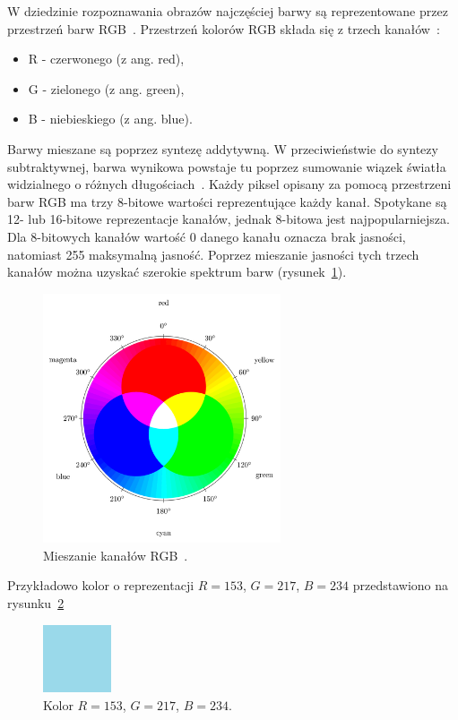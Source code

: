 \documentclass[a4paper,twoside,12pt]{book}
\begin{document}
    W dziedzinie rozpoznawania obrazów najczęściej barwy są reprezentowane przez przestrzeń barw
    RGB~\cite{przestrzenieKolorow}.
    Przestrzeń kolorów RGB składa się z trzech kanałów~\cite{kolory}:
    \begin{itemize}
        \item R - czerwonego (z ang. red),
        \item G - zielonego (z ang. green),
        \item B - niebieskiego (z ang. blue).
    \end{itemize}
    Barwy mieszane są poprzez syntezę addytywną.
    W przeciwieństwie do syntezy subtraktywnej, barwa wynikowa powstaje tu poprzez sumowanie wiązek światła widzialnego o
    różnych długościach~\cite{przestrzenieKolorow}.
    Każdy piksel opisany za pomocą przestrzeni barw RGB ma trzy 8-bitowe wartości reprezentujące każdy kanał.
    Spotykane
    są 12- lub 16-bitowe reprezentacje kanałów, jednak 8-bitowa jest najpopularniejsza.
    Dla 8-bitowych kanałów
    wartość 0
    danego kanału oznacza brak jasności, natomiast 255 maksymalną jasność.
    Poprzez mieszanie jasności tych trzech kanałów
    można uzyskać szerokie spektrum barw (rysunek~\ref{fig.mieszanieKolorow}).

    \begin{figure}[h!]
        \centering
        \includegraphics[width=7cm]{Obrazy/mieszanieKolorow.jpg}
        \caption{Mieszanie kanałów RGB~\cite{colorMixing}.}
        \label{fig.mieszanieKolorow}
    \end{figure}

    Przykładowo kolor o reprezentacji $R=153$, $G=217$, $B=234$ przedstawiono na rysunku~\ref{fig.mieszanieKolorowBlekitny}

    \begin{figure}
        \centering
        \includegraphics[width=2cm]{Obrazy/blekitny.jpg}
        \caption{Kolor $R=153$, $G=217$, $B=234$.}
        \label{fig.mieszanieKolorowBlekitny}
    \end{figure}
\end{document}
